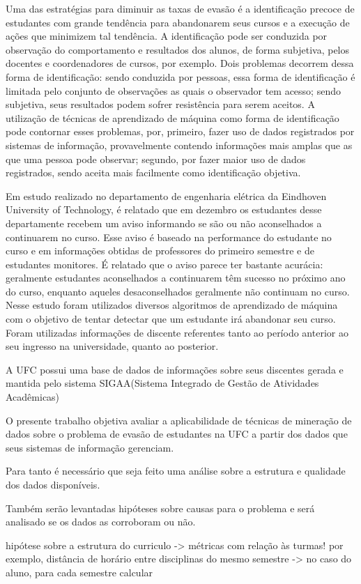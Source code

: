 Uma das estratégias para diminuir as taxas de evasão é a identificação precoce de estudantes com grande tendência para abandonarem seus cursos e a execução de ações que minimizem tal tendência. A identificação pode ser conduzida por observação do comportamento e resultados dos alunos, de forma subjetiva, pelos docentes e coordenadores de cursos, por exemplo. Dois problemas decorrem dessa forma de identificação: sendo conduzida por pessoas, essa forma de identificação é limitada pelo conjunto de observações as quais o observador tem acesso; sendo subjetiva, seus resultados podem sofrer resistência para serem aceitos. A utilização de técnicas de aprendizado de máquina como forma de identificação pode contornar esses problemas, por, primeiro, fazer uso de dados registrados por sistemas de informação, provavelmente contendo informações mais amplas que as que uma pessoa pode observar; segundo, por fazer maior uso de dados registrados, sendo aceita mais facilmente como identificação objetiva. 

Em estudo realizado no departamento de engenharia elétrica da Eindhoven University of Technology\cite{EDM_pred_dropout}, é relatado que em dezembro os estudantes desse departamente recebem um aviso informando se são ou não aconselhados a continuarem no curso. Esse aviso é baseado na performance do estudante no curso e em informações obtidas de professores do primeiro semestre e de estudantes monitores. É relatado que o aviso parece ter bastante acurácia: geralmente estudantes aconselhados a continuarem têm sucesso no próximo ano do curso, enquanto aqueles desaconselhados geralmente não continuam no curso. Nesse estudo foram utilizados diversos algoritmos de aprendizado de máquina com o objetivo de tentar detectar que um estudante irá abandonar seu curso. Foram utilizadas informações de discente referentes tanto ao período anterior ao seu ingresso na universidade, quanto ao posterior. 

A UFC possui uma base de dados de informações sobre seus discentes gerada e mantida pelo sistema SIGAA(Sistema Integrado de Gestão de Atividades Acadêmicas)


O presente trabalho objetiva avaliar a aplicabilidade de técnicas de mineração de dados sobre o problema de evasão de estudantes na UFC a partir dos dados que seus sistemas de informação gerenciam.  

Para tanto é necessário que seja feito uma análise sobre a estrutura e qualidade dos dados disponíveis.

Também serão levantadas hipóteses sobre causas para o problema e será analisado se os dados as corroboram ou não.

hipótese sobre a estrutura do curriculo -> métricas com relação às turmas! por exemplo, distância de horário entre disciplinas do mesmo semestre -> no caso do aluno, para cada semestre calcular

